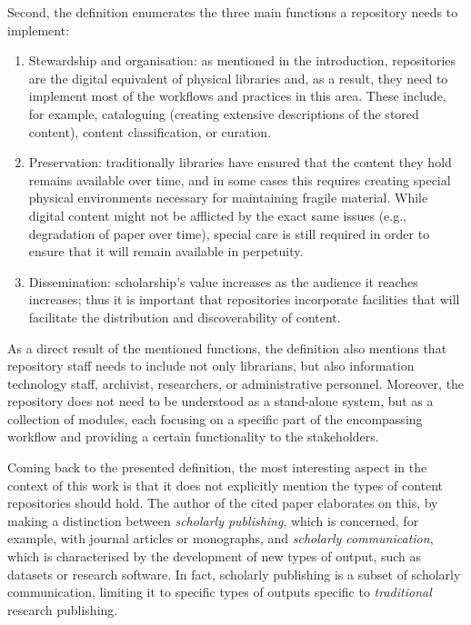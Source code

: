 Second, the definition enumerates the three main functions a repository needs to implement:
\begin{enumerate}
    \item Stewardship and organisation: as mentioned in the introduction, repositories are the digital equivalent of physical libraries and, as a result, they need to implement most of the workflows and practices in this area. These include, for example, cataloguing (creating extensive descriptions of the stored content), content classification, or curation.
    \item Preservation: traditionally libraries have ensured that the content they hold remains available over time, and in some cases this requires creating special physical environments necessary for maintaining fragile material. While digital content might not be afflicted by the exact same issues (e.g., degradation of paper over time), special care is still required in order to ensure that it will remain available in perpetuity. 
    \item Dissemination: scholarship's value increases as the audience it reaches increases; thus it is important that repositories incorporate facilities that will facilitate the distribution and discoverability of content.
\end{enumerate}

As a direct result of the mentioned functions, the definition also mentions that repository staff needs to include not only librarians, but also information technology staff, archivist, researchers, or administrative personnel. Moreover, the repository does not need to be understood as a stand-alone system, but as a collection of modules, each focusing on a specific part of the encompassing workflow and providing a certain functionality to the stakeholders.

Coming back to the presented definition, the most interesting aspect in the context of this work is that it does not explicitly mention the types of content repositories should hold. The author of the cited paper elaborates on this, by making a distinction between \emph{scholarly publishing}, which is concerned, for example, with journal articles or monographs, and \emph{scholarly communication}, which is characterised by the development of new types of output, such as datasets or research software. In fact, scholarly publishing is a subset of scholarly communication, limiting it to specific types of outputs specific to \emph{traditional} research publishing.

